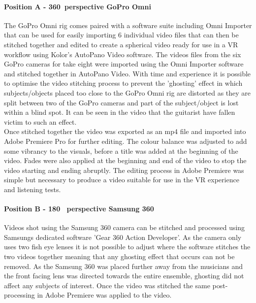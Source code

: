 				\paragraph{Position A - 360\textdegree~perspective GoPro Omni}
					The GoPro Omni rig comes paired with a software suite including Omni Importer that can be used for easily importing 6 individual video files that can then be stitched together and edited to create a spherical video ready for use in a VR workflow using Kolor's AutoPano Video software. The videos files from the six GoPro cameras for take eight were imported using the Omni Importer software and stitched together in AutoPano Video. With time and experience it is possible to optimise the video stitching process to prevent the 'ghosting' effect in which subjects/objects placed too close to the GoPro Omni rig are distorted as they are split between two of the GoPro cameras and part of the subject/object is lost within a blind spot. It can be seen in the video that the guitarist have fallen victim to such an effect.\\

					Once stitched together the video was exported as an mp4 file and imported into Adobe Premiere Pro \cite{AdobePremiere} for further editing. The colour balance was adjusted to add some vibrancy to the visuals, before a title was added at the beginning of the video. Fades were also applied at the beginning and end of the video to stop the video starting and ending abruptly. The editing process in Adobe Premiere was simple but necessary to produce a video suitable for use in the VR experience and listening tests.

				\paragraph{Position B - 180\textdegree~ perspective Samsung 360}
					Videos shot using the Samsung 360 camera can be stitched and processed using Samsungs dedicated software 'Gear 360 Action Developer'\cite{actiondev}. As the camera only uses two fish eye lenses it is not possible to adjust where the software stitches the two videos together meaning that any ghosting effect that occurs can not be removed. As the Samsung 360 was placed further away from the musicians and the front facing lens was directed towards the entire ensemble, ghosting did not affect any subjects of interest. Once the video was stitched the same post-processing in Adobe Premiere was applied to the video.\\
			
